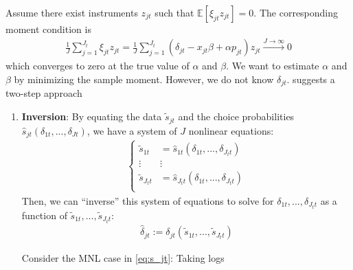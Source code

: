 \documentclass[11pt]{elegantbook}
\begin{document}
Assume there exist instruments $z_{jt}$ such that $\mathbb{E}[\xi_{jt}z_{jt}]=0$. The corresponding moment condition is
\begin{equation}
    \begin{aligned}
        \frac{1}{J}\sum_{j=1}^{J_t}\xi_{jt}z_{jt}=\frac{1}{J}\sum_{j=1}^{J_t}\left(\delta_{jt}-x_{jt}\beta+\alpha p_{jt}\right)z_{jt} \stackrel{J \rightarrow \infty}{\longrightarrow} 0
    \end{aligned}
    \label{eq:iv_moment}
    \tag{Sample Moment}
\end{equation}
which converges to zero at the true value of $\alpha$ and $\beta$. We want to estimate $\alpha$ and $\beta$ by minimizing the sample moment. However, we do not know $\delta_{jt}$. \cite{berry1994estimating} suggests a two-step approach
\begin{enumerate}
    \item \textbf{Inversion}: By equating the data $\tilde{s}_{jt}$ and the choice probabilities $\hat{s}_{jt}(\delta_{1t},...,\delta_{Jt})$, we have a system of $J$ nonlinear equations:
    \begin{equation}
        \begin{aligned}
            \left\{\begin{matrix}
                \tilde{s}_{1t}&=\hat{s}_{1t}(\delta_{1t},...,\delta_{J_tt})\\
                \vdots&\vdots\\
                \tilde{s}_{J_tt}&=\hat{s}_{J_tt}(\delta_{1t},...,\delta_{J_tt})\\
            \end{matrix}\right.
        \end{aligned}
        \nonumber
    \end{equation}
    Then, we can ``inverse'' this system of equations to solve for $\delta_{1t},...,\delta_{J_tt}$ as a function of $\tilde{s}_{1t},...,\tilde{s}_{J_tt}$:
    \begin{equation}
        \begin{aligned}
            \hat{\delta}_{jt}:=\delta_{jt}(\tilde{s}_{1t},...,\tilde{s}_{J_tt})
        \end{aligned}
        \nonumber
    \end{equation}
    \begin{example}
        Consider the MNL case in \eqref{eq:s_jt}:
        Taking logs
        \begin{equation}
            \begin{aligned}

\end{aligned}
\end{equation}
\end{example}
\end{enumerate}
\end{document}
